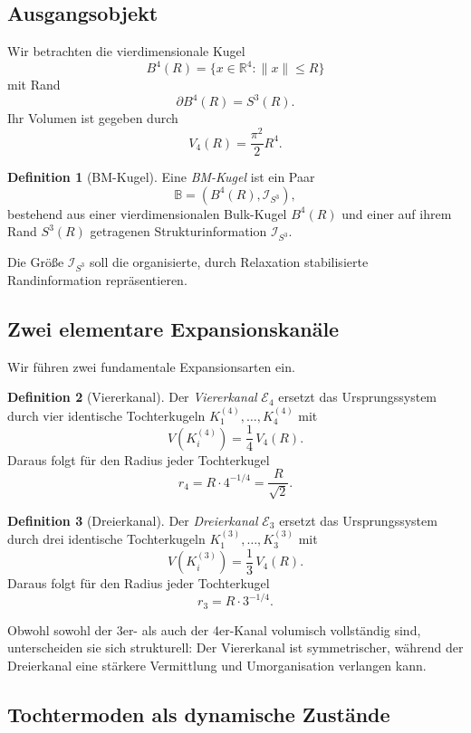 \documentclass[11pt,a4paper]{article}
\theoremstyle{definition}
\newtheorem{definition}{Definition}[section]
\theoremstyle{plain}
\theoremstyle{remark}
\begin{document}
	\subsection{Ausgangsobjekt}
	
	Wir betrachten die vierdimensionale Kugel
	\[
	B^4(R)=\{x\in \mathbb{R}^4 : \|x\|\le R\}
	\]
	mit Rand
	\[
	\partial B^4(R)=S^3(R).
	\]
	Ihr Volumen ist gegeben durch
	\[
	V_4(R)=\frac{\pi^2}{2}R^4.
	\]
	
	\begin{definition}[BM-Kugel]
		Eine \emph{BM-Kugel} ist ein Paar
		\[
		\mathbb{B}=(B^4(R),\mathcal{I}_{S^3}),
		\]
		bestehend aus einer vierdimensionalen Bulk-Kugel \(B^4(R)\) und einer auf ihrem Rand \(S^3(R)\) getragenen Strukturinformation \(\mathcal{I}_{S^3}\).
	\end{definition}
	
	Die Größe \(\mathcal{I}_{S^3}\) soll die organisierte, durch Relaxation stabilisierte Randinformation repräsentieren.
	
	\subsection{Zwei elementare Expansionskanäle}
	
	Wir führen zwei fundamentale Expansionsarten ein.
	
	\begin{definition}[Viererkanal]
		Der \emph{Viererkanal} \(\mathcal{E}_4\) ersetzt das Ursprungssystem durch vier identische Tochterkugeln \(K_1^{(4)},\dots,K_4^{(4)}\) mit
		\[
		V(K_i^{(4)})=\frac14\,V_4(R).
		\]
		Daraus folgt für den Radius jeder Tochterkugel
		\[
		r_4 = R\cdot 4^{-1/4} = \frac{R}{\sqrt{2}}.
		\]
	\end{definition}
	
	\begin{definition}[Dreierkanal]
		Der \emph{Dreierkanal} \(\mathcal{E}_3\) ersetzt das Ursprungssystem durch drei identische Tochterkugeln \(K_1^{(3)},\dots,K_3^{(3)}\) mit
		\[
		V(K_i^{(3)})=\frac13\,V_4(R).
		\]
		Daraus folgt für den Radius jeder Tochterkugel
		\[
		r_3 = R\cdot 3^{-1/4}.
		\]
	\end{definition}
	
	Obwohl sowohl der 3er- als auch der 4er-Kanal volumisch vollständig sind, unterscheiden sie sich strukturell: Der Viererkanal ist symmetrischer, während der Dreierkanal eine stärkere Vermittlung und Umorganisation verlangen kann.
	
	\subsection{Tochtermoden als dynamische Zustände}
	
\end{document}
